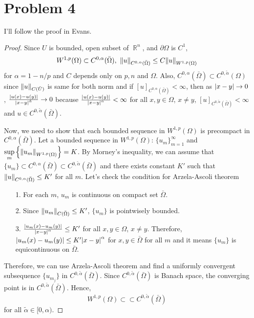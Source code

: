 \documentclass{article}
\DeclareMathOperator{\rr}{\mathbb{R}}
\begin{document}
\section*{Problem 4}
I'll follow the proof in Evans.
\begin{proof}
Since $U$ is bounded, open subset of $\rr^n$, and $\partial \Omega$ is $C^1$,
\begin{equation*}
W^{1,p}(\Omega)\subset C^{0, \alpha}(\bar{\Omega}),~\norm{u}_{C^{0, \alpha}(\bar{\Omega})}\leq C\norm{u}_{W^{1,p}(\Omega)}
\end{equation*}
for $\alpha=1-n/p$ and $C$ depends only on $p,n$ and $\Omega$. Also, $C^{0, \alpha}(\bar{\Omega})\subset C^{0, \tilde{\alpha}}(\Omega)$ since $\norm{u}_{C(\bar{U})}$ is same for both norm and if $[u]_{C^{0, \alpha}(\bar{\Omega})}<\infty$, then as $\abs{x-y}\rightarrow 0$, $\frac{\abs{u(x)-u(y)}}{\abs{x-y}^{\tilde{\alpha}}}\rightarrow 0$ because $\frac{\abs{u(x)-u(y)}}{\abs{x-y}^{\alpha}}<\infty$ for all $x,y\in \Omega$, $x\neq y$, $[u]_{C^{0,\tilde{\alpha}}(\bar{\Omega})}<\infty$ and $u\in C^{0, \tilde{\alpha}}(\bar{\Omega})$.

Now, we need to show that each bounded sequence in $W^{1,p}(\Omega)$ is precompact in $C^{0, \alpha}(\bar{\Omega})$. Let a bounded sequence in $W^{1,p}(\Omega)$: $\{u_m\}_{m=1}^\infty$ and $\sup\limits_m\left\{\norm{u_m}_{W^{1,p}(\Omega)}\right\}=K$. 
By Morney's inequality, we can assume that $\{u_m\}\subset C^{0, \alpha}(\bar{\Omega})\subset C^{0, \tilde{\alpha}}(\bar{\Omega})$ and there exists constant $K'$ such that $\norm{u}_{C^{0, \alpha}(\bar{\Omega})}\leq K'$ for all $m$. Let's check the condition for Arzela-Ascoli theorem
\begin{enumerate}
\item[1.] For each $m$, $u_m$ is continuous on compact set $\bar{\Omega}$.
\item[2.] Since $\norm{u_m}_{C(\bar{\Omega})}\leq K'$, $\{u_m\}$ is pointwisely bounded.
\item[3.] $\frac{\abs{u_m(x)-u_m(y)}}{\abs{x-y}^{\alpha}}\leq K'$ for all $x,y\in \Omega$, $x\neq y$. Therefore, $\abs{u_m(x)-u_m(y)}\leq K'\abs{x-y}^\alpha$ for $x,y\in \bar{\Omega}$ for all $m$ and it means $\{u_m\}$ is equicontinuous on $\bar{\Omega}$.
\end{enumerate}
Therefore, we can use Arzela-Ascoli theorem and find a uniformly convergent subsequence $\{u_{m_j}\}$ in $C^{0, \tilde{\alpha}}(\bar{\Omega})$. Since $C^{0, \tilde{\alpha}}(\bar{\Omega})$ is Banach space, the converging point is in $C^{0, \tilde{\alpha}}(\bar{\Omega})$. Hence,
\begin{equation*}
W^{1,p}(\Omega)\subset\subset C^{0, \tilde{\alpha}}(\bar{\Omega})
\end{equation*}
for all $\tilde{\alpha}\in [0, \alpha)$.
\end{proof}
\end{document}
